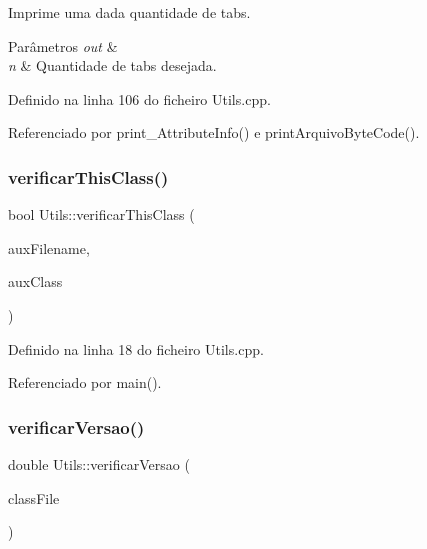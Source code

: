 Imprime uma dada quantidade de tabs. 
\begin{DoxyParams}{Parâmetros}
{\em out} & \\
\hline
{\em n} & Quantidade de tabs desejada. \\
\hline
\end{DoxyParams}


Definido na linha 106 do ficheiro Utils.\+cpp.



Referenciado por print\+\_\+\+Attribute\+Info() e print\+Arquivo\+Byte\+Code().

\mbox{\label{classUtils_aa70b3d26f8b094e4bb4bbf3e05a6bd63}} 
\subsubsection{\texorpdfstring{verificar\+This\+Class()}{verificarThisClass()}}
{\footnotesize\ttfamily bool Utils\+::verificar\+This\+Class (\begin{DoxyParamCaption}\item[{string}]{aux\+Filename,  }\item[{string}]{aux\+Class }\end{DoxyParamCaption})\hspace{0.3cm}{\ttfamily [static]}}



Definido na linha 18 do ficheiro Utils.\+cpp.



Referenciado por main().

\mbox{\label{classUtils_a234dd450e6192a9ddbcd7e68e9a09841}} 
\subsubsection{\texorpdfstring{verificar\+Versao()}{verificarVersao()}}
{\footnotesize\ttfamily double Utils\+::verificar\+Versao (\begin{DoxyParamCaption}\item[{\hyperlink{classClassFile}{Class\+File} $\ast$}]{class\+File }\end{DoxyParamCaption})\hspace{0.3cm}{\ttfamily [static]}}

